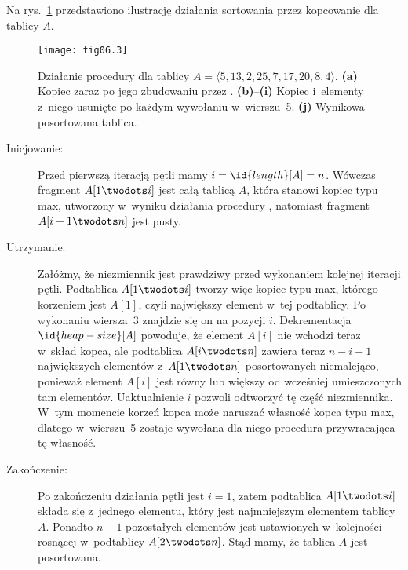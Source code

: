 
\exercise %
Na rys.~\ref{fig:6.4-1} przedstawiono ilustrację działania sortowania przez kopcowanie dla tablicy $A$.
\begin{figure}[ht]
	\begin{center}
		\texttt{[image: fig06.3]}
	\end{center}
	\caption{Działanie procedury  dla tablicy $A=\langle5,13,2,25,7,17,20,8,4\rangle$. {\sffamily\bfseries(a)} Kopiec zaraz po jego zbudowaniu przez . {\sffamily\bfseries(b)}--{\sffamily\bfseries(i)} Kopiec i~elementy z~niego usunięte po każdym wywołaniu  w~wierszu~5. {\sffamily\bfseries(j)} Wynikowa posortowana tablica.} \label{fig:6.4-1}
\end{figure}

\exercise %
\begin{description}
	\item[Inicjowanie:] Przed pierwszą iteracją pętli mamy $i=\id{length}[A]=n$. Wówczas fragment $A[1\twodots i]$ jest całą tablicą $A$, która stanowi kopiec typu max, utworzony w~wyniku działania procedury , natomiast fragment $A[i+1\twodots n]$ jest pusty.
	\item[Utrzymanie:] Załóżmy, że niezmiennik jest prawdziwy przed wykonaniem kolejnej iteracji pętli. Podtablica $A[1\twodots i]$ tworzy więc kopiec typu max, którego korzeniem jest $A[1]$, czyli największy element w~tej podtablicy. Po wykonaniu wiersza~3 znajdzie się on na pozycji $i$. Dekrementacja $\id{heap-size}[A]$ powoduje, że element $A[i]$ nie wchodzi teraz w~skład kopca, ale podtablica $A[i\twodots n]$ zawiera teraz $n-i+1$ największych elementów z~$A[1\twodots n]$ posortowanych niemalejąco, ponieważ element $A[i]$ jest równy lub większy od wcześniej umieszczonych tam elementów. Uaktualnienie $i$ pozwoli odtworzyć tę część niezmiennika. W~tym momencie korzeń kopca może naruszać własność kopca typu max, dlatego w~wierszu~5 zostaje wywołana dla niego procedura  przywracająca tę własność.
	\item[Zakończenie:] Po zakończeniu działania pętli jest $i=1$, zatem podtablica $A[1\twodots i]$ składa się z~jednego elementu, który jest najmniejszym elementem tablicy $A$. Ponadto $n-1$ pozostałych elementów jest ustawionych w~kolejności rosnącej w~podtablicy $A[2\twodots n]$. Stąd mamy, że tablica $A$ jest posortowana.
\end{description}

